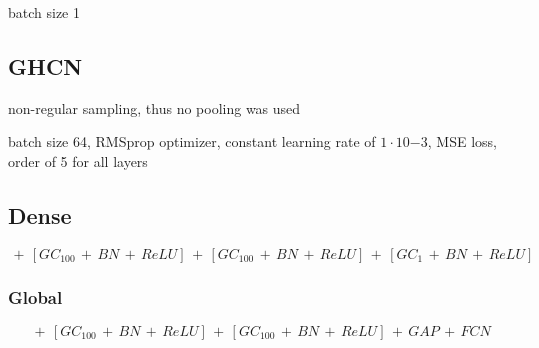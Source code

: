 \documentclass{article} %
\begin{document}
batch size 1
\subsection{GHCN}
non-regular sampling, thus no pooling was used

batch size 64, RMSprop optimizer, constant learning rate of $1 \cdot 10{-3}$, MSE loss, order of 5 for all layers
\subsection*{Dense}

\begin{dmath}
    [GC_{50}\, +\, BN\, +\, ReLU]\, +\, [GC_{100}\, +\, BN\, +\, ReLU]\, +\, [GC_{100}\, +\, BN\, +\, ReLU]\, +\, [GC_{1}\, +\, BN\, +\, ReLU]
\end{dmath}

\subsubsection*{Global}

\begin{dmath}
    [GC_{50}\, +\, BN\, +\, ReLU]\, +\, [GC_{100}\, +\, BN\, +\, ReLU]\, +\, [GC_{100}\, +\, BN\, +\, ReLU]\, +\, GAP\, +\, FCN
\end{dmath}
\end{document}
